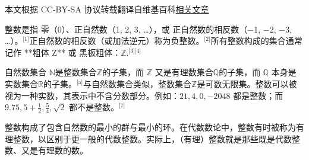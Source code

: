 
本文根据 CC-BY-SA 协议转载翻译自维基百科\href{https://en.wikipedia.org/wiki/Integer}{相关文章}

整数是指 零（0）、正自然数（1, 2, 3, …），或 正自然数的相反数（−1, −2, −3, …）。\(^\text{[1]}\)正自然数的相反数（或加法逆元）称为负整数。\(^\text{[2]}\)所有整数构成的集合通常记作 **粗体 Z** 或 黑板粗体：$\mathbb{Z}$.\(^\text{[3][4]}\)  

自然数集合  $\mathbb{N}$是整数集合$\mathbb{Z}$的子集，而 $\mathbb{Z}$ 又是有理数集合$\mathbb{Q}$的子集，而 $\mathbb{Q}$ 本身是实数集合$\mathbb{R}$的子集。\(^\text{[a]}\)与自然数集合类似，整数集合$\mathbb{Z}$是可数无限集。整数可以被视为一种实数，其表示中不含分数部分。例如：$21, 4, 0, -2048$ 都是整数；而 $9.75, 5+\tfrac{1}{2}, \tfrac{5}{4}, \sqrt{2}$ 都不是整数。\(^\text{[7]}\)

整数构成了包含自然数的最小的群与最小的环。在代数数论中，整数有时被称为有理整数，以区别于更一般的代数整数。实际上，（有理）整数就是那些既是代数整数、又是有理数的数。
